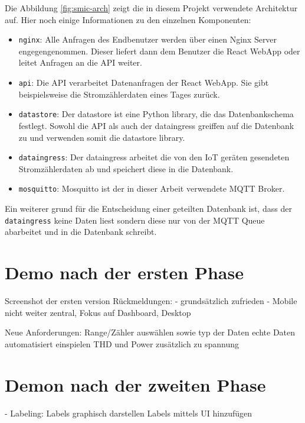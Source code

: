 Die Abbildung \ref{fig:smic-arch} zeigt die in diesem Projekt verwendete
Architektur auf. Hier noch einige Informationen zu den einzelnen Komponenten:


\begin{itemize}
    \item \texttt{nginx}:
        Alle Anfragen des Endbenutzer werden über einen Nginx Server
        engegengenommen. Dieser liefert dann dem Benutzer die React WebApp
        oder leitet Anfragen an die \ac{API} weiter.

    \item \texttt{api}:
        Die \ac{API} verarbeitet Datenanfragen der React WebApp. Sie gibt
        beispielsweise die Stromzählerdaten eines Tages zurück.

    \item \texttt{datastore}:
        Der datastore ist eine Python library, die das Datenbankschema festlegt.
        Sowohl die \ac{API} als auch der dataingress greiffen auf die Datenbank zu
        und verwenden somit die datastore library.

    \item \texttt{dataingress}:
        Der dataingress arbeitet die von den \ac{IoT} geräten gesendeten
        Stromzählerdaten ab und speichert diese in die Datenbank.

    \item \texttt{mosquitto}:
        Mosquitto ist der in dieser Arbeit verwendete \ac{MQTT} Broker.
\end{itemize}

Ein weiterer grund für die Entscheidung einer geteilten Datenbank ist,
dass der \texttt{dataingress} keine Daten liest sondern diese nur von
der \ac{MQTT} Queue abarbeitet und in die Datenbank schreibt.

\section{Demo nach der ersten Phase}
Screenshot der ersten version
Rückmeldungen:
- grundsätzlich zufrieden
- Mobile nicht weiter zentral, Fokus auf Dashboard, Desktop

Neue Anforderungen:
Range/Zähler auswählen sowie typ der Daten
echte Daten automatisiert einspielen
THD und Power zusätzlich zu spannung

\section{Demon nach der zweiten Phase}
- Labeling:
Labels graphisch darstellen
Labels mittels UI hinzufügen
